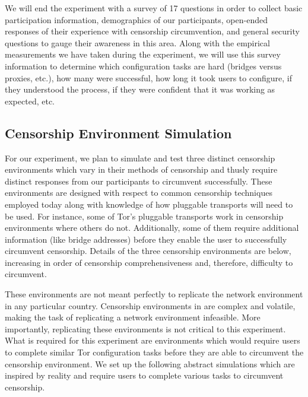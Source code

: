 \documentclass[letterpaper,twocolumn,11pt]{article}
\begin{document}
We will end the experiment with a survey of 17 questions in order to collect basic participation information, 
demographics of our participants, open-ended responses of their experience with censorship circumvention,
and general security questions to gauge their awareness in this area. Along with the empirical measurements 
we have taken during the experiment, we will use this survey information to determine which configuration tasks are hard (bridges versus proxies, etc.), how many were successful, how long it took users to configure, if they understood the process, if they were confident that it was working as expected, etc.  

\subsection{Censorship Environment Simulation}
\indent \indent For our experiment, we plan to simulate and test three distinct censorship environments
which vary in their methods of censorship and thusly require distinct responses from our 
participants to circumvent successfully. These environments are designed with respect to 
common censorship techniques employed 
today along with knowledge of how pluggable transports will need to be used.
For instance, some of Tor's pluggable transports work in censorship environments
where others do not. Additionally, some of them require additional information (like bridge 
addresses) before they enable the user to successfully circumvent censorship. 
Details of the three censorship environments are below, increasing in 
order of censorship comprehensiveness and, therefore, difficulty to circumvent. 

These environments are not meant perfectly to replicate the network environment
in any particular country.  Censorship environments in are complex and volatile, making
the task of replicating a network environment infeasible. More importantly, replicating these
environments is not critical to this experiment. What is required for this experiment are 
environments which would require users to complete similar Tor configuration 
tasks before they are able to circumvent the censorship environment. We set up the following 
abstract simulations which are inspired by reality and require users to complete various tasks
to circumvent censorship. 
\end{document}
